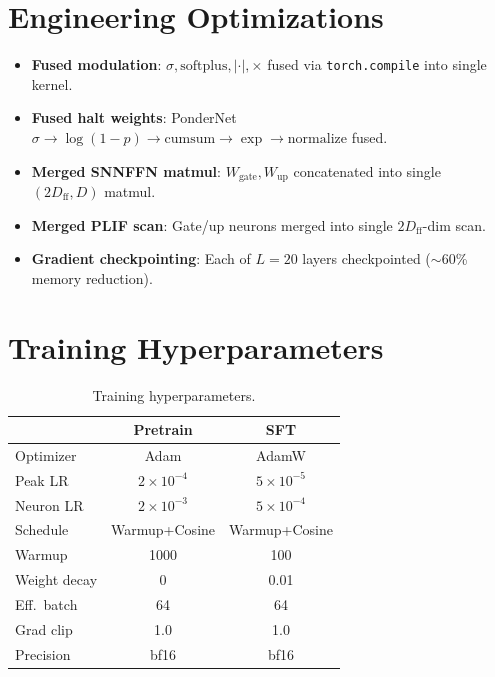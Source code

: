 \documentclass{article}
\begin{document}
\section{Engineering Optimizations}
\label{app:engineering}

\begin{itemize}
    \item \textbf{Fused modulation}: $\sigma, \text{softplus}, |\cdot|, \times$ fused via \texttt{torch.compile} into single kernel.
    \item \textbf{Fused halt weights}: PonderNet $\sigma \to \log(1{-}p) \to \text{cumsum} \to \exp \to \text{normalize}$ fused.
    \item \textbf{Merged SNNFFN matmul}: $W_{\text{gate}}, W_{\text{up}}$ concatenated into single $(2D_{\text{ff}}, D)$ matmul.
    \item \textbf{Merged PLIF scan}: Gate/up neurons merged into single $2D_{\text{ff}}$-dim scan.
    \item \textbf{Gradient checkpointing}: Each of $L{=}20$ layers checkpointed ($\sim$60\% memory reduction).
\end{itemize}

\section{Training Hyperparameters}
\label{app:training}

\begin{table}[H]
\centering
\small
\caption{Training hyperparameters.}
\begin{tabular}{lcc}
\toprule
& \textbf{Pretrain} & \textbf{SFT} \\
\midrule
Optimizer & Adam & AdamW \\
Peak LR & $2{\times}10^{-4}$ & $5{\times}10^{-5}$ \\
Neuron LR & $2{\times}10^{-3}$ & $5{\times}10^{-4}$ \\
Schedule & Warmup+Cosine & Warmup+Cosine \\
Warmup & 1000 & 100 \\
Weight decay & 0 & 0.01 \\
Eff.\ batch & 64 & 64 \\
Grad clip & 1.0 & 1.0 \\
Precision & bf16 & bf16 \\
\bottomrule
\end{tabular}
\end{table}
\end{document}
